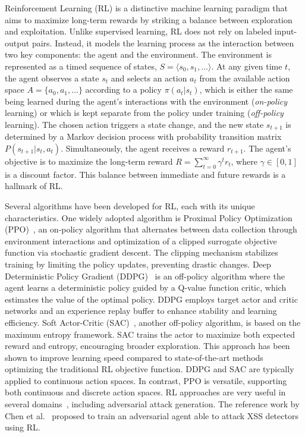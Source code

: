 Reinforcement Learning (RL) is a distinctive machine learning paradigm that aims to maximize long-term rewards by striking a balance between exploration and exploitation. Unlike supervised learning, RL does not rely on labeled input-output pairs. Instead, it models the learning process as the interaction between two key components: the agent and the environment. The environment is represented as a timed sequence of states, $S=\langle s_0, s_1, \ldots\rangle$. At any given time $t$, the agent observes a state $s_t$ and selects an action $a_t$ from the available action space $A=\{a_0, a_1, \ldots\}$ according to a policy $\pi(a_t | s_t)$, which is either the same being learned during the agent's interactions with the environment (\textit{on-policy} learning) or which is kept separate from the policy under training (\textit{off-policy} learning). The chosen action triggers a state change, and the new state $s_{t+1}$ is determined by a Markov decision process with probability transition matrix $P(s_{t+1} | s_{t}, a_{t})$. Simultaneously, the agent receives a reward $r_{t+1}$. The agent's objective is to maximize the long-term reward $R=\sum_{t=0}^{\infty}{\gamma^t r_t}$, where $\gamma \in [0,1]$ is a discount factor. This balance between immediate and future rewards is a hallmark of RL. 


Several algorithms have been developed for RL, each with its unique characteristics. One widely adopted algorithm is Proximal Policy Optimization (PPO)~\cite{schulman2017proximal}, an on-policy algorithm that alternates between data collection through environment interactions and optimization of a clipped surrogate objective function via stochastic gradient descent. The clipping mechanism stabilizes training by limiting the policy updates, preventing drastic changes. Deep Deterministic Policy Gradient (DDPG)~\cite{lillicrap2020continuous} is an off-policy algorithm where the agent learns a deterministic policy guided by a Q-value function critic, which estimates the value of the optimal policy. DDPG employs target actor and critic networks and an experience replay buffer to enhance stability and learning efficiency. Soft Actor-Critic (SAC)~\cite{haarnoja2018soft}, another off-policy algorithm, is based on the maximum entropy framework. SAC trains the actor to maximize both expected reward and entropy, encouraging broader exploration. This approach has been shown to improve learning speed compared to state-of-the-art methods optimizing the traditional RL objective function. DDPG and SAC are typically applied to continuous action spaces. %
In contrast, PPO is versatile, supporting both continuous and discrete action spaces.
RL approaches are very useful in several domains~\cite{SHAKYA2023120495}, including  adversarial attack generation.
The reference work by Chen et al.~\cite{CHEN2022102831} proposed to train an adversarial agent able to attack XSS detectors using RL.
